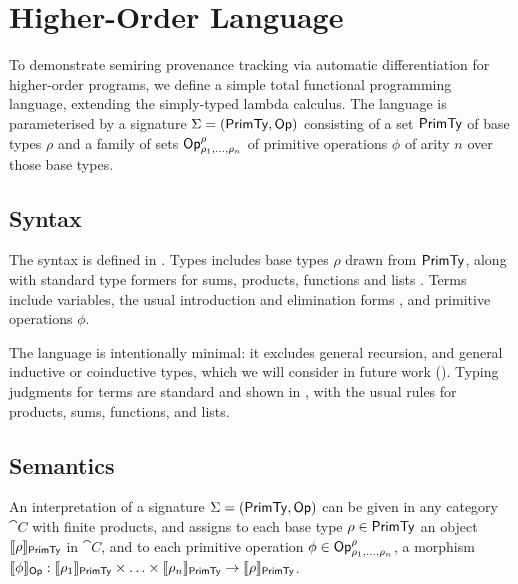 \section{Higher-Order Language}
\label{sec:language}

To demonstrate semiring provenance tracking via automatic differentiation for higher-order programs, we define a simple total functional
programming language, extending the simply-typed lambda calculus. The language is parameterised by a signature
$\Sigma = (\mathsf{PrimTy}, \mathsf{Op})$ consisting of a set $\mathsf{PrimTy}$ of base types $\rho$ and a family of sets
$\mathsf{Op}^\rho_{\rho_1,\ldots,\rho_n}$ of primitive operations $\phi$ of arity $n$ over those base types.

\subsection{Syntax}
\label{sec:language:syntax}

The syntax is defined in . Types includes base types $\rho$ drawn from $\mathsf{PrimTy}$, along with
standard type formers for sums, products, functions and lists%
. Terms include
variables, the usual introduction and elimination forms%
, and
primitive operations $\phi$.

The language is intentionally minimal: it excludes general recursion, and general inductive or coinductive
types, which we will consider in future work (). Typing judgments for terms are standard
and shown in , with the usual rules for products, sums, functions, and lists.




\subsection{Semantics}
\label{sec:language:semantics}



An interpretation of a signature $\Sigma = (\mathsf{PrimTy}, \mathsf{Op})$ can be given in any category $\cat{C}$ with
finite products, and assigns to each base type $\rho \in \mathsf{PrimTy}$ an object $\llbracket \rho \rrbracket_{\mathsf{PrimTy}}$ in
$\cat{C}$, and to each primitive operation $\phi \in \mathsf{Op}^\rho_{\rho_1,\ldots,\rho_n}$, a morphism
$\llbracket \phi \rrbracket_{\mathsf{Op}}: \llbracket \rho_1 \rrbracket_{\mathsf{PrimTy}} \times \ldots \times \llbracket \rho_n \rrbracket_{\mathsf{PrimTy}} \to
\llbracket \rho \rrbracket_{\mathsf{PrimTy}}$.

